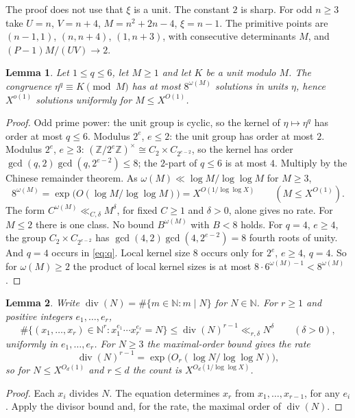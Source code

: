 \documentclass{amsart}
\newtheorem{lemma}{Lemma}[section]
\numberwithin{equation}{section}
\numberwithin{table}{section}
\newcommand{\N}{\mathbb{N}}
\begin{document}
The proof does not use that $\xi$ is a unit. The constant $2$ is sharp. For
odd $n\ge3$ take $U=n$, $V=n+4$, $M=n^2+2n-4$, $\xi=n-1$. The primitive points
are $(n-1,1)$, $(n,n+4)$, $(1,n+3)$, with consecutive determinants $M$, and
$(P-1)M/(UV)\to2$.

\begin{lemma}\label{lem:qroot}
Let $1\le q\le6$, let $M\ge1$ and let $K$ be a unit modulo $M$. The congruence
$\eta^{q}\equiv K\pmod M$ has at most $8^{\omega(M)}$ solutions in units $\eta$,
hence $X^{o(1)}$ solutions uniformly for $M\le X^{O(1)}$.
\end{lemma}

\begin{proof}
Odd prime power: the unit group is cyclic, so the kernel of $\eta\mapsto\eta^q$
has order at most $q\le6$. Modulus $2^e$, $e\le2$: the unit group has order
at most $2$. Modulus $2^e$, $e\ge3$:
$(\mathbb Z/2^e\mathbb Z)^\times\cong C_2\times C_{2^{e-2}}$, so the kernel has
order $\gcd(q,2)\gcd(q,2^{e-2})\le8$; the $2$-part of $q\le6$ is at most
$4$. Multiply by the Chinese remainder theorem. As
$\omega(M)\ll\log M/\log\log M$ for $M\ge3$,
\[
 8^{\omega(M)}=\exp\bigl(O(\log M/\log\log M)\bigr)=X^{O(1/\log\log X)}
 \qquad(M\le X^{O(1)}).
\]
The form $C^{\omega(M)}\ll_{C,\delta}M^{\delta}$, for fixed $C\ge1$ and $\delta>0$, alone gives no rate. For
$M\le2$ there is one class. No bound $B^{\omega(M)}$ with $B<8$ holds. For
$q=4$, $e\ge4$, the group $C_2\times C_{2^{e-2}}$ has
$\gcd(4,2)\gcd(4,2^{e-2})=8$ fourth roots of unity. And $q=4$ occurs in
\eqref{eq:q}. Local kernel size $8$ occurs only for $2^e$, $e\ge4$, $q=4$. So
for $\omega(M)\ge2$ the product of local kernel sizes is at most
$8\cdot6^{\omega(M)-1}<8^{\omega(M)}$.
\end{proof}

\begin{lemma}\label{lem:divisor}
Write $\operatorname{div}(N)=\#\{m\in\N:m\mid N\}$ for $N\in\N$. For
$r\ge1$ and positive integers $e_1,\dots,e_r$,
\[
 \#\{(x_1,\dots,x_r)\in\N^r:x_1^{e_1}\cdots x_r^{e_r}=N\}
 \le \operatorname{div}(N)^{r-1}\ll_{r,\delta}N^{\delta}\qquad(\delta>0),
\]
uniformly in $e_1,\dots,e_r$. For $N\ge3$ the maximal-order bound gives the
rate
\[
 \operatorname{div}(N)^{r-1}=\exp\!\bigl(O_r(\log N/\log\log N)\bigr),
\]
so for $N\le X^{O_d(1)}$ and $r\le d$ the count is $X^{O_d(1/\log\log X)}$.
\end{lemma}

\begin{proof}
Each $x_i$ divides $N$. The equation determines $x_r$ from
$x_1,\dots,x_{r-1}$, for any $e_i$. Apply the divisor bound and, for the rate,
the maximal order of $\operatorname{div}(N)$.
\end{proof}
\end{document}
